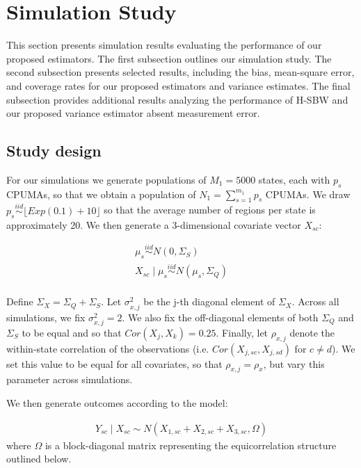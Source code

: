 \section{Simulation Study}\label{app:simstudy}

This section presents simulation results evaluating the performance of our proposed estimators. The first subsection outlines our simulation study. The second subsection presents selected results, including the bias, mean-square error, and coverage rates for our proposed estimators and variance estimates. The final subsection provides additional results analyzing the performance of H-SBW and our proposed variance estimator absent measurement error.

\subsection{Study design}

For our simulations we generate populations of $M_1 = 5000$ states, each with $p_s$ CPUMAs, so that we obtain a population of $N_1 = \sum_{s=1}^{m_1} p_s$ CPUMAs. We draw $p_s \stackrel{iid}\sim \lfloor Exp(0.1) + 10\rfloor$ so that the average number of regions per state is approximately 20. We then generate a 3-dimensional covariate vector $X_{sc}$:

\begin{align*}
\mu_s \stackrel{iid}\sim N(0, \Sigma_S) \\
X_{sc} \mid \mu_s \stackrel{iid}\sim N(\mu_s, \Sigma_Q) \\
\end{align*}

Define $\Sigma_X = \Sigma_Q + \Sigma_S$. Let $\sigma^2_{x, j}$ be the j-th diagonal element of $\Sigma_X$. Across all simulations, we fix $\sigma^2_{x, j} = 2$. We also fix the off-diagonal elements of both $\Sigma_Q$ and $\Sigma_S$ to be equal and so that $Cor(X_j, X_k) = 0.25$. Finally, let $\rho_{x, j}$ denote the within-state correlation of the observations (i.e. $Cor(X_{j, sc}, X_{j, sd})$ for $c \ne d$). We set this value to be equal for all covariates, so that $\rho_{x, j} = \rho_x$, but vary this parameter across simulations.

We then generate outcomes according to the model:

\begin{align*}
Y_{sc} \mid X_{sc} \sim N(X_{1, sc} + X_{2, sc} + X_{3, sc}, \Omega)
\end{align*}
%
where $\Omega$ is a block-diagonal matrix representing the equicorrelation structure outlined below.

